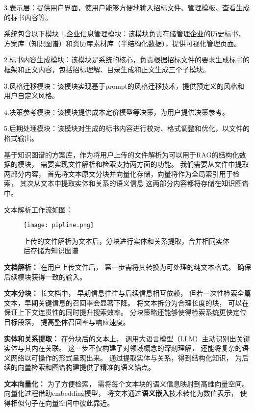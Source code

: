 \documentclass{xmu}
\begin{document}
3.表示层：提供用户界面，使用户能够方便地输入招标文件、管理模板、查看生成的标书内容等。

系统包含以下模块
1.企业信息管理模块：该模块负责存储管理企业的历史标书、方案库（知识图谱）和资历库素材库（半结构化数据），提供可视化管理页面。

2.标书内容生成模块：该模块是系统的核心，负责根据招标文件的要求生成标书的框架和正文内容，包括招标理解、目录生成和正文生成三个子模块。

3.风格迁移模块：该模块实现基于prompt的风格迁移技术，提供预定义的风格和用户自定义风格。

4.决策参考模块：该模块提供成本定价模型等决策，为用户提供决策参考。

5.后期处理模块：该模块对生成的标书内容进行校对、格式调整和优化，以文件的格式输出。


基于知识图谱的方案库，作为将用户上传的文件解析为可以用于RAG的结构化数据的模块，
需要实现文件解析和检索支持两方面的功能。
我们需要从文件中提取两部分内容，
首先将文本原文分块并向量化存储，向量将作为全局索引用于检索，
其次从文本中提取实体和关系的语义信息
这两部分内容都将存储在知识图谱中。

文本解析工作流如图：

\begin{figure}[!htb]
    \centering
    \texttt{[image: pipline.png]}\\
    \caption{上传的文件解析为文本后，分块进行实体和关系提取，合并相同实体后存储为知识图谱}\label{wenbwenjiexi}
\end{figure}

{\bf 文档解析：} 在用户上传文件后，
第一步需将其转换为可处理的纯文本格式。
确保后续模块获得一致的输入。

{\bf 文本分块：} 长文档中，
早期信息往往与后续信息相互依赖，
但若一次性检索全篇文本，早期关键信息的召回率会显著下降\cite{Long}。
将文本拆分为合理长度的块，
可以在保证上下文连贯性的同时提升搜索效率。
分块策略还能够使得检索系统更快定位目标段落，
提高整体召回率与响应速度。

{\bf 实体和关系提取：} 在分块后的文本上，
调用大语言模型（LLM）主动识别出关键实体与其内在关联。
这一步不仅构建了对领域概念的深刻理解，
还能将复杂的语义网络以可操作的形式呈现出来。
通过提取实体与关系，得到结构化知识，
为后续的向量检索和图谱构建提供了精准的语义锚点。

{\bf 文本向量化：} 为了方便检索，
需将每个文本块的语义信息映射到高维向量空间。
向量化过程借助embedding模型，
将文本通过{\bf 语义嵌入}技术转化为数值表示，
使得相似句子在向量空间中彼此靠近。
\end{document}
